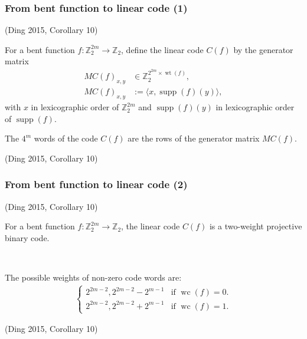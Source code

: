 \documentclass[pdf,sprung,slideColor,nocolorBG]{beamer}
\newcommand{\slidecite}[1]{\tiny{(#1)}\normalsize{}}
\newcommand{\smallcite}[1]{\small{(#1)}\normalsize{}}
\newcommand{\mb}[1]{\mathbb{#1}}
\newcommand{\To}{\rightarrow}
\newcommand{\support}[1]{\operatorname{supp}\left(#1\right)}
\newcommand{\weight}[1]{\operatorname{wt}\left(#1\right)}
\newcommand{\weightclass}[1]{\operatorname{wc}\left(#1\right)}
\newcommand{\Z}{\mb{Z}}
\begin{document}
\begin{frame}
\frametitle{From bent function to linear code (1)}
\begin{Definition}

\smallcite{Ding 2015, Corollary 10} 

For a bent function $f : \Z_2^{2m} \To \Z_2$, 
define the linear code $C(f)$ by the generator matrix
\begin{align*}
M C(f)_{x,y} &\in \Z_2^{2^{2m} \times \weight{f}},
\\
M C(f)_{x,y} &:= \langle x, \support{f}(y) \rangle,
\end{align*}
with $x$ in lexicographic order of $\Z_2^{2m}$ 
and $\support{f}(y)$ in lexicographic order of $\support{f}$.

The $4^m$ words of the code $C(f)$ are the rows of the generator matrix $M C(f)$.
\end{Definition}

\slidecite{Ding 2015, Corollary 10} 
 
\end{frame}
\begin{frame}
\frametitle{From bent function to linear code (2)}
\begin{Theorem}
\smallcite{Ding 2015, Corollary 10} 

For a bent function $f : \Z_2^{2m} \To \Z_2$, the linear code $C(f)$
is a two-weight projective binary code.

~

The possible weights of non-zero code words are:
\begin{align*}
\begin{cases}
2^{2m-2}, 2^{2m-2} - 2^{m-1} & \text{if~} \weightclass{f}=0.
\\
2^{2m-2}, 2^{2m-2} + 2^{m-1} & \text{if~} \weightclass{f}=1.
\end{cases}
\end{align*}

\end{Theorem}

\slidecite{Ding 2015, Corollary 10} 
 
\end{frame}
\end{document}
